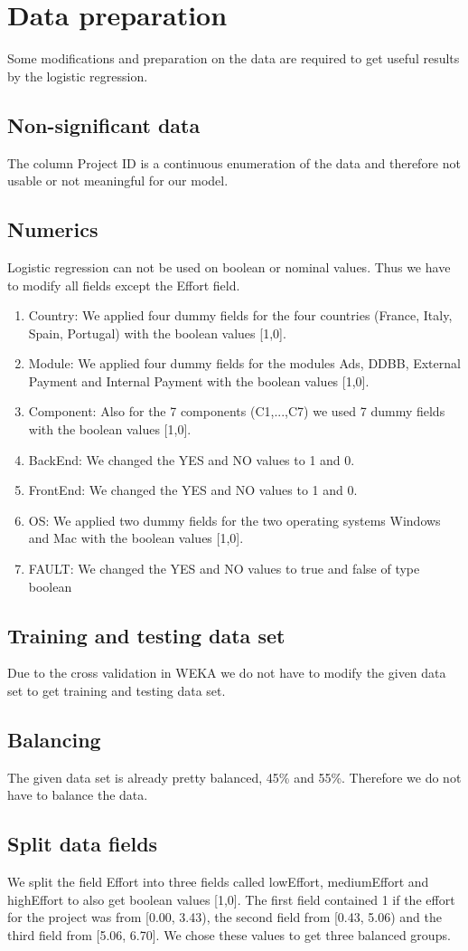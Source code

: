 \chapter{Data preparation}
Some modifications and preparation on the data are required to get useful results by the logistic regression.

\section{Non-significant data}
The column Project ID is a continuous enumeration of the data and therefore not usable or not meaningful for our model.

\section{Numerics}
Logistic regression can not be used on boolean or nominal values. Thus we have to modify all fields except the Effort field.
\begin{enumerate}
	\item Country: We applied four dummy fields for the  four countries (France, Italy, Spain, Portugal) with the boolean values [1,0].
	\item Module: We applied four dummy fields for the modules Ads, DDBB, External Payment and Internal Payment with the boolean values [1,0].
	\item Component: Also for the 7 components (C1,...,C7) we used 7 dummy fields with the boolean values [1,0].
	\item BackEnd: We changed the YES and NO values to 1 and 0.
	\item FrontEnd: We changed the YES and NO values to 1 and 0.
	\item OS: We applied two dummy fields for the two operating systems Windows and Mac with the boolean values [1,0].
	\item FAULT: We changed the YES and NO values to true and false of type boolean
\end{enumerate}

\section{Training and testing data set}
Due to the cross validation in WEKA we do not have to modify the given data set to get training and testing data set.

\section{Balancing}
The given data set is already pretty balanced, 45\% and 55\%. Therefore we do not have to balance the data.

\section{Split data fields}
We split the field Effort into three fields called lowEffort, mediumEffort and highEffort to also get boolean values [1,0]. The first field contained 1 if the effort for the project was from [0.00, 3.43), the second field from [0.43, 5.06) and the third field from [5.06, 6.70]. We chose these values to get three balanced groups.
